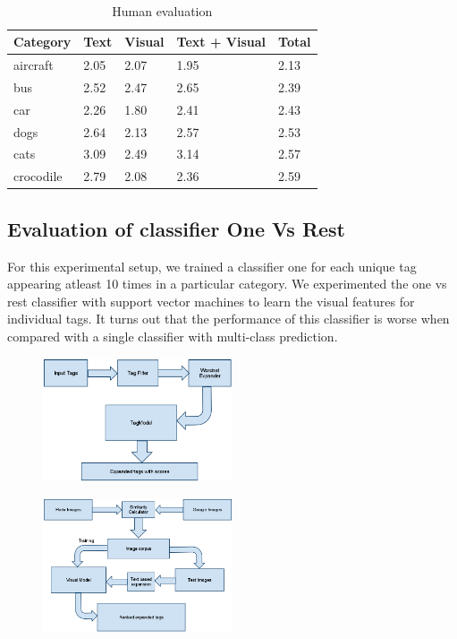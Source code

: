 \documentclass[12pt]{article}
\begin{document}
\begin{table}
  \caption{Human evaluation}
\begin{center}
    \begin{tabular}{|l l l l l|}
\hline
Category & Text & Visual & Text + Visual & Total \\
\hline
aircraft & 2.05 & 2.07 & 1.95 & 2.13 \\
bus & 2.52 & 2.47 & 2.65 & 2.39 \\
car & 2.26 & 1.80 & 2.41 & 2.43 \\
dogs & 2.64 & 2.13 & 2.57 & 2.53 \\
cats & 3.09 & 2.49 & 3.14 & 2.57 \\
crocodile & 2.79 & 2.08 & 2.36 & 2.59 \\
\hline
\end{tabular}
\end{center}
\end{table}

\subsection{Evaluation of classifier One Vs Rest}
For this experimental setup, we trained a classifier one for each unique tag appearing atleast
10 times in a particular category. We experimented the one vs rest classifier with support vector
machines to learn the visual features for individual tags. It turns out that the performance of
this classifier is worse when compared with a single classifier with multi-class prediction.


\begin{figure}[H]
\includegraphics[width=0.5\textwidth]{tagExpansion.png}
\end{figure}

\begin{figure}[H]
\includegraphics[width=0.5\textwidth]{model.png}
\end{figure}
\end{document}
